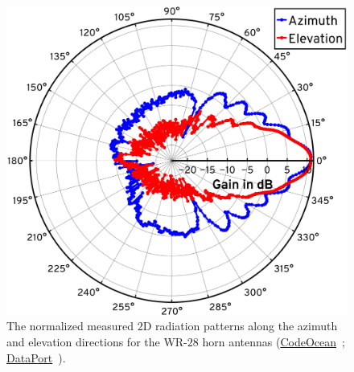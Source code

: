 \documentclass[10pt, twocolumn]{IEEEtran}
\begin{document}
{\begin{figure} [t]
    \centering
    \includegraphics[width=0.55\linewidth]{figs/antenna_patterns.pdf}
    \caption{The normalized measured $2$D radiation patterns along the azimuth and elevation directions for the WR-$28$ horn antennas (\href{https://codeocean.com/capsule/9545863/tree}{CodeOcean}~\cite{CodeOcean}; \href{http://ieee-dataport.org/12580}{DataPort}~\cite{DataPort}).}
    \vspace{-6mm}
    \label{F4}
\end{figure}
}
\end{document}
